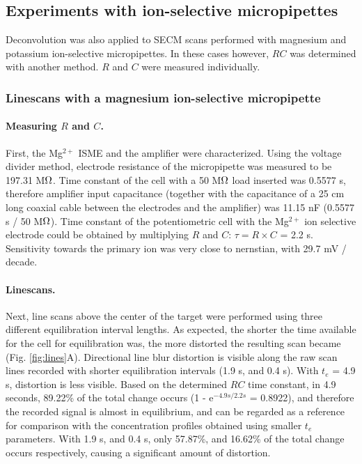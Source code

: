 		\subsection{Experiments with ion-selective micropipettes}
Deconvolution was also applied to SECM scans performed with magnesium and potassium ion-selective micropipettes.
In these cases however, $RC$ was determined with another method.
$R$ and $C$ were measured individually.

			\subsubsection{Linescans with a magnesium ion-selective micropipette}
\label{capacitance} 
				\paragraph{Measuring $R$ and $C$.}

First, the Mg$^{2+}$ ISME and the amplifier were characterized.
Using the voltage divider method, electrode resistance of the micropipette was measured to be 197.31 M$\ohm$.
Time constant of the cell with a 50 M$\ohm$ load inserted was 0.5577 s, therefore amplifier input capacitance (together with the capacitance of a 25 cm long coaxial cable between the electrodes and the amplifier) was 11.15 nF (0.5577 s / 50 M$\ohm$).
Time constant of the potentiometric cell with the Mg$^{2+}$ ion selective electrode could be obtained by multiplying $R$ and $C$: $\tau = R\times C$ = 2.2 s.
Sensitivity towards the primary ion was very close to nernstian, with 29.7 mV / decade.

				\paragraph{Linescans.}
Next, line scans above the center of the target were performed using three different equilibration interval lengths.
As expected, the shorter the time available for the cell for equilibration was, the more distorted the resulting scan became (Fig. \ref{fig:lines}A).
Directional line blur distortion is visible along the raw scan lines recorded with shorter equilibration intervals (1.9 s, and 0.4 s).
With $t_e$ = 4.9 s, distortion is less visible.
Based on the determined $RC$ time constant, in 4.9 seconds, 89.22\% of the total change occurs (1 - e$^{-4.9 s / 2.2 s}$ = 0.8922), and therefore the recorded signal is almost in equilibrium, and can be regarded as a reference for comparison with the concentration profiles obtained using smaller $t_e$ parameters.
With 1.9 s, and 0.4 s, only 57.87\%, and 16.62\% of the total change occurs respectively, causing a significant amount of distortion.

